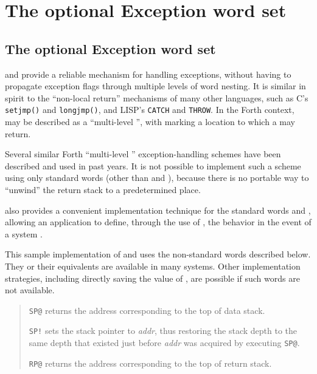 \chapter{The optional Exception word set} %

\begin{intro}
\section{The optional Exception word set}

 and  provide a reliable mechanism for
handling exceptions, without having to propagate exception flags
through multiple levels of word nesting. It is similar in spirit
to the ``non-local return'' mechanisms of many other languages,
such as C's \texttt{setjmp()} and \texttt{longjmp()}, and LISP's
\texttt{CATCH} and \texttt{THROW}. In the Forth context, 
may be described as a ``multi-level '', with
 marking a location to which a  may return.

Several similar Forth ``multi-level ''
exception-handling schemes have been described and used in past years.
It is not possible to implement such a scheme using only standard words
(other than  and ), because there is no portable
way to ``unwind'' the return stack to a predetermined place.

 also provides a convenient implementation technique for
the standard words  and , allowing an
application to define, through the use of , the behavior
in the event of a system .

This sample implementation of  and  uses the
non-standard words described below. They or their equivalents are
available in many systems. Other implementation strategies, including
directly saving the value of , are possible if such
words are not available.

\begin{quote}
\texttt{SP@} 
	returns the address corresponding to the top of data stack.

\texttt{SP!} 
	sets the stack pointer to \emph{addr}, thus restoring the stack
	depth to the same depth that existed just before \emph{addr} was
	acquired by executing \texttt{SP@}.

\texttt{RP@} 
	returns the address corresponding to the top of return stack.


\end{quote}
\end{intro}
